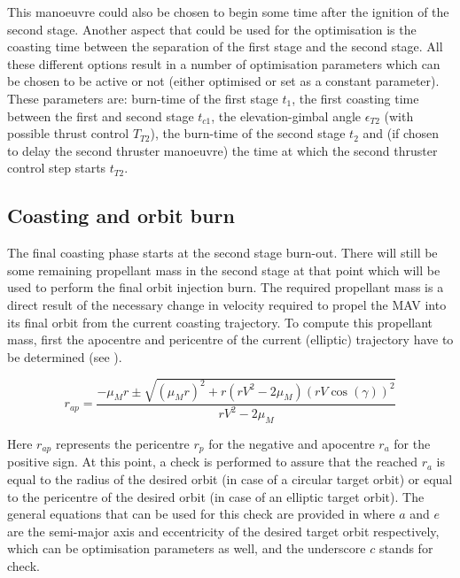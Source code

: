 This manoeuvre could also be chosen to begin some time after the ignition of the second stage. Another aspect that could be used for the optimisation is the coasting time between the separation of the first stage and the second stage. All these different options result in a number of optimisation parameters which can be chosen to be active or not (either optimised or set as a constant parameter). These parameters are: burn-time of the first stage $t_{1}$, the first coasting time between the first and second stage $t_{c1}$, the elevation-gimbal angle $\epsilon_{T2}$ (with possible thrust control $T_{T2}$), the burn-time of the second stage $t_{2}$ and (if chosen to delay the second thruster manoeuvre) the time at which the second thruster control step starts $t_{T2}$. 





\subsection{Coasting and orbit burn}
\label{subsec:asc_coast_burn}
The final coasting phase starts at the second stage burn-out. There will still be some remaining propellant mass in the second stage at that point which will be used to perform the final orbit injection burn. The required propellant mass is a direct result of the necessary change in velocity required to propel the \ac{MAV} into its final orbit from the current coasting trajectory. To compute this propellant mass, first the apocentre and pericentre of the current (elliptic) trajectory have to be determined \cite{fanning1996model} (see ).

\begin{equation} \label{eq:apsis_asc}
r_{ap}=\dfrac{-\mu_{M}r\pm\sqrt{\left(\mu_{M}r\right)^{2}+r\left(rV^{2}-2\mu_{M}\right)\left(rV\cos\left(\gamma\right)\right)^{2}}}{rV^{2}-2\mu_{M}}
\end{equation}  

Here $r_{ap}$ represents the pericentre $r_{p}$ for the negative and apocentre $r_{a}$ for the positive sign. At this point, a check is performed to assure that the reached $r_{a}$ is equal to the radius of the desired orbit (in case of a circular target orbit) or equal to the pericentre of the desired orbit (in case of an elliptic target orbit). The general equations that can be used for this check are provided in  \cite{wakker2010astro1} where $a$ and $e$ are the semi-major axis and eccentricity of the desired target orbit respectively, which can be optimisation parameters as well, and the underscore $c$ stands for check.

